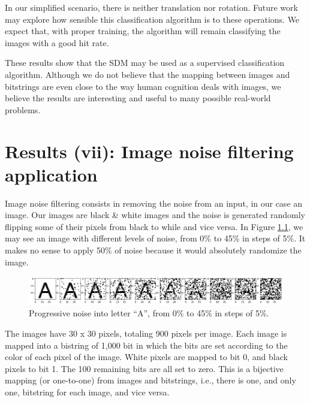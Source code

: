 In our simplified scenario, there is neither translation nor rotation. Future work may explore how sensible this classification algorithm is to these operations. We expect that, with proper training, the algorithm will remain classifying the images with a good hit rate.

These results show that the SDM may be used as a supervised classification algorithm. Although we do not believe that the mapping between images and bitstrings are even close to the way human cognition deals with images, we believe the results are interesting and useful to many possible real-world problems.













\chapter{Results (vii): Image noise filtering application}

\lstset{
    language=Python,
    basicstyle=\small\ttfamily,
}

Image noise filtering consists in removing the noise from an input, in our case an image. Our images are black \& white images and the noise is generated randomly flipping some of their pixels from black to while and vice versa. In Figure \ref{fig-filter-progressive-noise}, we may see an image with different levels of noise, from 0\% to 45\% in steps of 5\%. It makes no sense to apply 50\% of noise because it would absolutely randomize the image.

\begin{figure}[!htb]
\centering\includegraphics[width=\textwidth]{./images02/filter/progressive-noise.png}
\caption{Progressive noise into letter ``A'', from 0\% to 45\% in steps of 5\%.
\label{fig-filter-progressive-noise}}
\end{figure}

The images have 30 x 30 pixels, totaling 900 pixels per image. Each image is mapped into a bistring of 1,000 bit in which the bits are set according to the color of each pixel of the image. White pixels are mapped to bit 0, and black pixels to bit 1. The 100 remaining bits are all set to zero. This is a bijective mapping (or one-to-one) from images and bitstrings, i.e., there is one, and only one, bitstring for each image, and vice versa.


